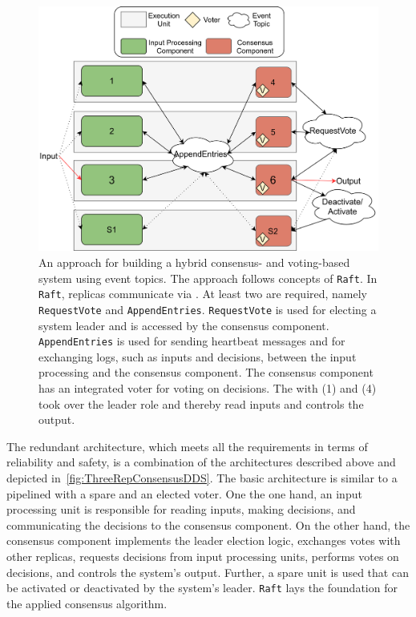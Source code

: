 \begin{figure}[!hb]
	\centering
	\includegraphics[width=0.9\linewidth]{images/ThreeEUConsensusDDS}
	\caption{An approach for building a hybrid consensus- and voting-based  system using  event topics. The approach follows concepts of \texttt{Raft}. In \texttt{Raft}, replicas communicate via . At least two  are required, namely \texttt{RequestVote} and \texttt{AppendEntries}. \texttt{RequestVote} is used for electing a system leader and is accessed by the consensus component. \texttt{AppendEntries} is used for sending heartbeat messages and for exchanging logs, such as inputs and decisions, between the input processing and the consensus component. The consensus component has an integrated voter for voting on decisions. The  with (1) and (4) took over the leader role and thereby read inputs and controls the output.}
	\label{fig:ThreeRepConsensusDDS}
\end{figure}

The redundant architecture, which meets all the requirements in terms of reliability and safety, is a combination of the architectures described above and depicted in~\autoref{fig:ThreeRepConsensusDDS}.
The basic architecture is similar to a pipelined  with a spare and an elected voter.
One the one hand, an input processing unit is responsible for reading inputs, making decisions, and communicating the decisions to the consensus component.
On the other hand, the consensus component implements the leader election logic, exchanges votes with other replicas, requests decisions from input processing units, performs votes on decisions, and controls the system's output.
Further, a spare unit is used that can be activated or deactivated by the system's leader.
\texttt{Raft} lays the foundation for the applied consensus algorithm.
\\

